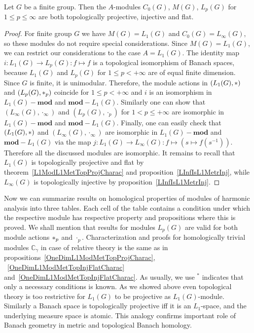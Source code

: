 \begin{proposition}\label{StdModFinGrL1MGTopInjProjFlatCharac} Let $G$ be a
finite group. Then the $A$-modules $C_0(G)$, $M(G)$, $L_p(G)$ 
for $1\leq p\leq \infty$ are both topologically projective, injective and flat.
\end{proposition} 
\begin{proof}
For finite group $G$ we have $M(G)=L_1(G)$ and $C_0(G)=L_\infty(G)$, so these
modules do not require special considerations. Since $M(G)=L_1(G)$, we can
restrict our considerations to the case $A=L_1(G)$. The identity map
$i:L_1(G)\to L_p(G):f\mapsto f$ is a topological isomorphism of Banach spaces,
because $L_1(G)$ and $L_p(G)$ for $1\leq p<+\infty$ are of equal finite
dimension. Since $G$ is finite, it is unimodular. Therefore, the module actions
in $(L_1(G),\ast)$ and $(L_p(G),\ast_p)$ coincide for $1\leq p<+\infty$
and $i$ is an isomorphism in $L_1(G)-\mathbf{mod}$ and $\mathbf{mod}-L_1(G)$.
Similarly one can show that $(L_\infty(G),\cdot_\infty)$ and $(L_p(G),\cdot_p)$
for $1<p\leq+\infty$ are isomorphic in $L_1(G)-\mathbf{mod}$ and
$\mathbf{mod}-L_1(G)$. Finally, one can easily check that $(L_1(G),\ast)$ and
$(L_\infty(G),\cdot_\infty)$ are isomorphic in $L_1(G)-\mathbf{mod}$ and
$\mathbf{mod}-L_1(G)$ via the 
map $j:L_1(G)\to L_\infty(G):f\mapsto(s\mapsto f(s^{-1}))$. Therefore all 
the discussed modules are isomorphic. It remains to
recall that $L_1(G)$ is topologically projective and flat by
theorem~\ref{L1ModL1MetTopProjCharac} and proposition~\ref{LInfIsL1MetrInj},
while $L_\infty(G)$ is topologically injective by
proposition~\ref{LInfIsL1MetrInj}.
\end{proof}

Now we can summarize results on homological properties of modules of harmonic
analysis into three tables. Each cell of the table contains a condition under
which the respective module has respective property and propositions where this
is proved. We shall mention that results for modules $L_p(G)$ are valid for both
module actions $\ast_p$ and $\cdot_p$. Characterization and proofs for
homologically trivial modules $\mathbb{C}_\gamma$ in case of relative theory is
the same as in
propositions~\ref{OneDimL1ModMetTopProjCharac},
~\ref{OneDimL1ModMetTopInjFlatCharac}
and~\ref{OneDimL1ModMetTopInjFlatCharac}. As usually, we use ${}^{*}$
indicates that only a necessary conditions is known. As we showed above even
topological theory is too restrictive for $L_1(G)$ to be projective as
$L_1(G)$-module. Similarly a Banach space is topologically projective iff it is
an $L_1$-space, and the underlying measure space is atomic. This analogy
confirms important role of Banach geometry in metric and topological Banach
homology.

